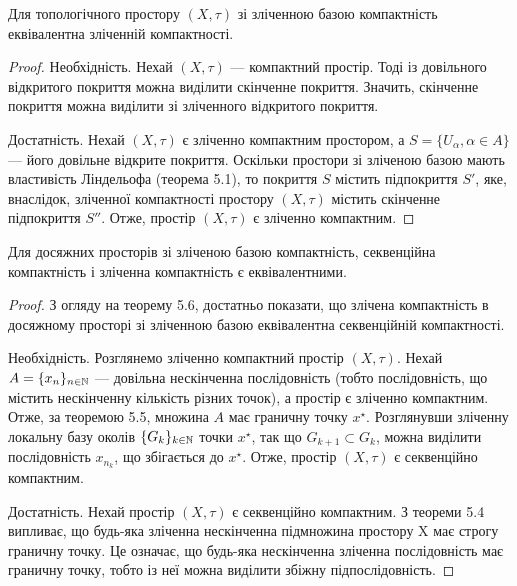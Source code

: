 \begin{theorem}
Для топологічного простору
$(X, \tau)$ зі зліченною базою компактність еквівалентна
зліченній компактності.
\end{theorem}

\begin{proof}
Необхідність. Нехай $(X, \tau)$ --- компактний
простір. Тоді із довільного відкритого покриття можна
виділити скінченне покриття. Значить, скінченне покриття
можна виділити зі зліченного відкритого покриття.

Достатність. Нехай $(X, \tau)$ є зліченно компактним
простором, а $S = \{U_\alpha, \alpha \in A\}$ --- його довільне відкрите
покриття. Оскільки простори зі зліченою базою мають
властивість Ліндельофа (теорема 5.1), то покриття $S$
містить підпокриття $S'$, яке, внаслідок, зліченної
компактності простору $(X, \tau)$ містить скінченне
підпокриття $S''$. Отже, простір $(X, \tau)$ є зліченно
компактним.
\end{proof}

\begin{theorem}
Для досяжних просторів зі зліченою базою
компактність, секвенційна компактність і зліченна
компактність є еквівалентними.
\end{theorem}

\begin{proof}
З огляду на теорему 5.6, достатньо показати,
що злічена компактність в досяжному просторі зі зліченною
базою еквівалентна секвенційній компактності.

Необхідність. Розглянемо зліченно компактний простір
$(X, \tau)$. Нехай $A = \{x_n\}_{n \in \mathbb{N}}$ --- довільна нескінченна
послідовність (тобто послідовність, що містить нескінченну
кількість різних точок), а простір є зліченно компактним.
Отже, за теоремою 5.5, множина $A$ має граничну точку $x^\star$.
Розглянувши зліченну локальну базу околів $\{G_k\}_{k \in \mathbb{N}}$ точки
$x^\star$, так що $G_{k + 1} \subset G_k$, можна виділити послідовність
$x_{n_k}$, що
збігається до $x^\star$. Отже, простір $(X, \tau)$ є секвенційно
компактним.

Достатність. Нехай простір $(X, \tau)$ є секвенційно
компактним. З теореми 5.4 випливає, що будь-яка зліченна
нескінченна підмножина простору X має строгу граничну
точку. Це означає, що будь-яка нескінченна зліченна
послідовність має граничну точку, тобто із неї можна
виділити збіжну підпослідовність.
\end{proof}

